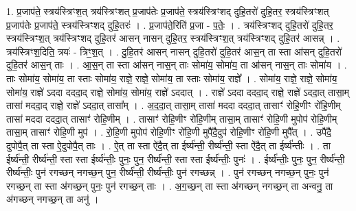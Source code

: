 \documentclass[17pt]{extarticle}
\begin{document}
1. प्र॒जाप॑ते॒ स्त्रय॑स्त्रिꣳश॒त् त्रय॑स्त्रिꣳशत् प्र॒जाप॑तेः प्र॒जाप॑ते॒ स्त्रय॑स्त्रिꣳशद् दुहि॒तरो॑ दुहि॒तर॒ स्त्रय॑स्त्रिꣳशत् प्र॒जाप॑तेः प्र॒जाप॑ते॒ स्त्रय॑स्त्रिꣳशद् दुहि॒तरः॑ । . प्र॒जाप॑ते॒रिति॑ प्र॒जा - प॒तेः॒ । . त्रय॑स्त्रिꣳशद् दुहि॒तरो॑ दुहि॒तर॒ स्त्रय॑स्त्रिꣳश॒त् त्रय॑स्त्रिꣳशद् दुहि॒तर॑ आसन् नासन् दुहि॒तर॒ स्त्रय॑स्त्रिꣳश॒त् त्रय॑स्त्रिꣳशद् दुहि॒तर॑ आसन्न् । . त्रय॑स्त्रिꣳश॒दिति॒ त्रयः॑ - त्रिꣳ॒॒श॒त् । . दु॒हि॒तर॑ आसन् नासन् दुहि॒तरो॑ दुहि॒तर॑ आस॒न् ता स्ता आ॑सन् दुहि॒तरो॑ दुहि॒तर॑ आस॒न् ताः । . आ॒स॒न् ता स्ता आ॑सन् नास॒न् ताः सोमा॑य॒ सोमा॑य॒ ता आ॑सन् नास॒न् ताः सोमा॑य । . ताः सोमा॑य॒ सोमा॑य॒ ता स्ताः सोमा॑य॒ राज्ञे॒ राज्ञे॒ सोमा॑य॒ ता स्ताः सोमा॑य॒ राज्ञे᳚ । . सोमा॑य॒ राज्ञे॒ राज्ञे॒ सोमा॑य॒ सोमा॑य॒ राज्ञे॑ ऽददा दददा॒द् राज्ञे॒ सोमा॑य॒ सोमा॑य॒ राज्ञे॑ ऽददात् । . राज्ञे॑ ऽददा दददा॒द् राज्ञे॒ राज्ञे॑ ऽददा॒त् तासा॒म् तासा॑ मददा॒द् राज्ञे॒ राज्ञे॑ ऽददा॒त् तासा᳚म् । . अ॒द॒दा॒त् तासा॒म् तासा॑ मददा दददा॒त् तासाꣳ॑ रोहि॒णीꣳ रो॑हि॒णीम् तासा॑ मददा दददा॒त् तासाꣳ॑ रोहि॒णीम् । . तासाꣳ॑ रोहि॒णीꣳ रो॑हि॒णीम् तासा॒म् तासाꣳ॑ रोहि॒णी मुपोप॑ रोहि॒णीम् तासा॒म् तासाꣳ॑ रोहि॒णी मुप॑ । . रो॒हि॒णी मुपोप॑ रोहि॒णीꣳ रो॑हि॒णी मुपै॑दै॒दुप॑ रोहि॒णीꣳ रो॑हि॒णी मुपै᳚त् । . उपै॑दै॒ दुपोपै॒त् ता स्ता ऐ॒दुपोपै॒त् ताः । . ऐ॒त् ता स्ता ऐ॑दै॒त् ता ईर्ष्य॑न्ती॒ रीर्ष्य॑न्ती॒ स्ता ऐ॑दै॒त् ता ईर्ष्य॑न्तीः । . ता ईर्ष्य॑न्ती॒ रीर्ष्य॑न्ती॒ स्ता स्ता ईर्ष्य॑न्तीः॒ पुनः॒ पुन॒ रीर्ष्य॑न्ती॒ स्ता स्ता ईर्ष्य॑न्तीः॒ पुनः॑ । . ईर्ष्य॑न्तीः॒ पुनः॒ पुन॒ रीर्ष्य॑न्ती॒ रीर्ष्य॑न्तीः॒ पुन॑ रगच्छन् नगच्छ॒न् पुन॒ रीर्ष्य॑न्ती॒ रीर्ष्य॑न्तीः॒ पुन॑ रगच्छन्न् । . पुन॑ रगच्छन् नगच्छ॒न् पुनः॒ पुन॑ रगच्छ॒न् ता स्ता अ॑गच्छ॒न् पुनः॒ पुन॑ रगच्छ॒न् ताः । . अ॒ग॒च्छ॒न् ता स्ता अ॑गच्छन् नगच्छ॒न् ता अन्वनु॒ ता अ॑गच्छन् नगच्छ॒न् ता अनु॑ । \newline
\end{document}
